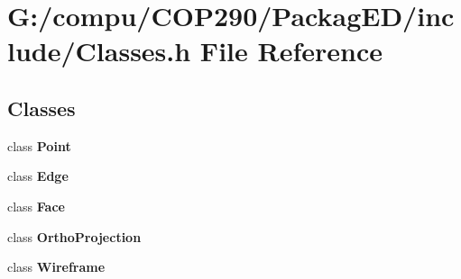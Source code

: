 \section{G\+:/compu/\+C\+O\+P290/\+Packag\+E\+D/include/\+Classes.h File Reference}
\label{include_2_classes_8h}
\subsection*{Classes}
\begin{DoxyCompactItemize}
\item 
class \textbf{ Point}
\item 
class \textbf{ Edge}
\item 
class \textbf{ Face}
\item 
class \textbf{ Ortho\+Projection}
\item 
class \textbf{ Wireframe}
\end{DoxyCompactItemize}
